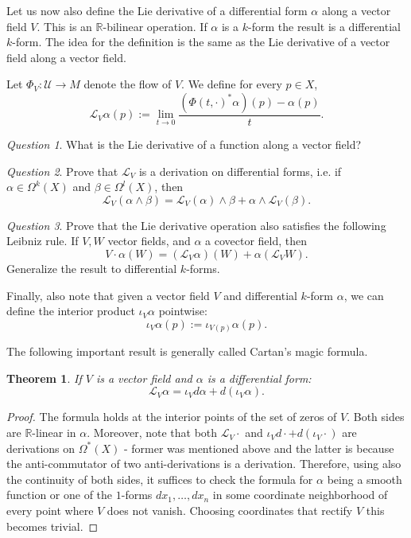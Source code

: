 \documentclass[12pt]{amsart}
\newtheorem{theorem}{Theorem}
\theoremstyle{remark}
\newtheorem{question}{Question}
\begin{document}
Let us now also define the Lie derivative of a differential form $\alpha$ along a vector field $V$. This is an $\mathbb{R}$-bilinear operation. If $\alpha$ is a $k$-form the result is a differential $k$-form. The idea for the definition is the same as the Lie derivative of a vector field along a vector field.

Let $\Phi_V:\mathcal{U}\to M$ denote the flow of $V$. We define for every $p\in X$, $$\mathcal{L}_V\alpha(p):=\lim_{t\to 0}\frac{(\Phi(t,\cdot)^*\alpha)(p)-\alpha(p)}{t}.$$

\begin{question}
What is the Lie derivative of a function along a vector field?
\end{question}

\begin{question}
Prove that $\mathcal{L}_V$ is a derivation on differential forms, i.e. if  $\alpha\in\Omega^k(X)$ and $\beta\in\Omega^l(X)$, then $$\mathcal{L}_V(\alpha\wedge\beta)=\mathcal{L}_V(\alpha)\wedge\beta+\alpha\wedge\mathcal{L}_V(\beta).$$
\end{question}

\begin{question}\label{qleibnizvectorform}
Prove that the Lie derivative operation also satisfies the following Leibniz rule. If $V,W$ vector fields, and $\alpha$ a covector field, then $$V\cdot \alpha(W)= (\mathcal{L}_V\alpha)(W)+\alpha(\mathcal{L}_VW).$$Generalize the result to differential $k$-forms.
\end{question}

Finally, also note that given a vector field $V$ and differential $k$-form $\alpha$, we can define the interior product $\iota_V\alpha$ pointwise: $$\iota_V\alpha(p):=\iota_{V(p)}\alpha(p).$$

The following important result is generally called Cartan's magic formula.

\begin{theorem}
If $V$ is a vector field and $\alpha$ is a differential form: $$\mathcal{L}_V\alpha=\iota_Vd\alpha+d(\iota_V\alpha).$$
\end{theorem}

\begin{proof}
The formula holds at the interior points of the set of zeros of $V$. Both sides are $\mathbb{R}$-linear in $\alpha$. Moreover, note that both $\mathcal{L}_V\cdot$ and $\iota_Vd\cdot+d(\iota_V\cdot)$ are derivations on $\Omega^*(X)$ - former was mentioned above and the latter is because the anti-commutator of two anti-derivations is a derivation. Therefore, using also the continuity of both sides, it suffices to check the formula for $\alpha$ being a smooth function or one of the $1$-forms $dx_1,\ldots ,dx_n$ in some coordinate neighborhood of every point where $V$ does not vanish. Choosing coordinates that rectify $V$ this becomes trivial.
\end{proof}
\end{document}
